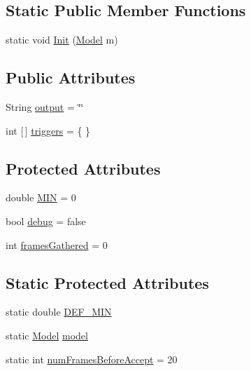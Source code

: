 \subsection*{Static Public Member Functions}
\begin{DoxyCompactItemize}
\item 
static void \hyperlink{class_real_sense_1_1_r_s_module_a4a96119975932690f75e86206e1fe63d}{Init} (\hyperlink{class_real_sense_1_1_model}{Model} m)
\end{DoxyCompactItemize}
\subsection*{Public Attributes}
\begin{DoxyCompactItemize}
\item 
String \hyperlink{class_real_sense_1_1_r_s_module_a5f0ea0ffd2361fd2b792ed808a67f911}{output} = \char`\"{}\char`\"{}
\item 
int \mbox{[}$\,$\mbox{]} \hyperlink{class_real_sense_1_1_r_s_module_a100988a1b957067db074dad8b4b9a078}{triggers} = \{ \}
\end{DoxyCompactItemize}
\subsection*{Protected Attributes}
\begin{DoxyCompactItemize}
\item 
double \hyperlink{class_real_sense_1_1_r_s_module_aac57c31e50cebecbcb46a0526d7a6ac0}{M\+IN} = 0
\item 
bool \hyperlink{class_real_sense_1_1_r_s_module_a5f460d4bb4cb4b000426f9d316deae03}{debug} = false
\item 
int \hyperlink{class_real_sense_1_1_r_s_module_aa3ca8a7dcab6b7c9be3021c6d14702cf}{frames\+Gathered} = 0
\end{DoxyCompactItemize}
\subsection*{Static Protected Attributes}
\begin{DoxyCompactItemize}
\item 
static double \hyperlink{class_real_sense_1_1_r_s_module_a157703aadbac7416f5fc0eb339546002}{D\+E\+F\+\_\+\+M\+IN}
\item 
static \hyperlink{class_real_sense_1_1_model}{Model} \hyperlink{class_real_sense_1_1_r_s_module_a29ce0491f4813a62b998effa782423d1}{model}
\item 
static int \hyperlink{class_real_sense_1_1_r_s_module_a9a8c8d17ca9321b558c50f2458a90f3c}{num\+Frames\+Before\+Accept} = 20
\end{DoxyCompactItemize}

